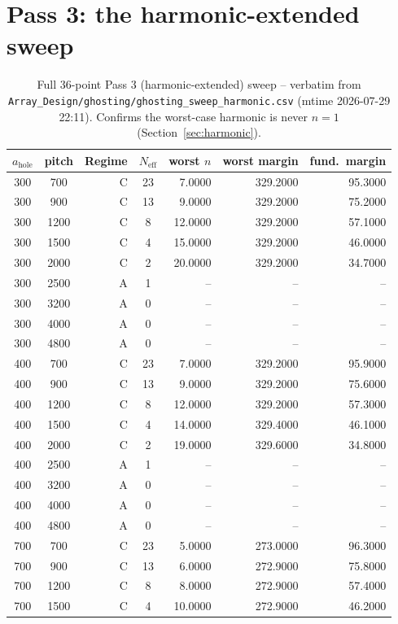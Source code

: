 \section{Pass 3: the harmonic-extended sweep}
\begin{longtable}{ccrcrrr}
\caption{Full 36-point Pass 3 (harmonic-extended) sweep -- verbatim from \texttt{Array\_Design/ghosting/ghosting\_sweep\_harmonic.csv} (mtime 2026-07-29 22:11). Confirms the worst-case harmonic is never $n=1$ (Section~\ref{sec:harmonic}).}\label{tab:full-pass3-sweep}\\
\toprule
$a_{\mathrm{hole}}$ & pitch & Regime & $N_{\mathrm{eff}}$ & worst $n$ & worst margin & fund.\ margin \\
\midrule
\endhead
300 & 700 & C & 23 & 7.0000 & 329.2000 & 95.3000 \\
300 & 900 & C & 13 & 9.0000 & 329.2000 & 75.2000 \\
300 & 1200 & C & 8 & 12.0000 & 329.2000 & 57.1000 \\
300 & 1500 & C & 4 & 15.0000 & 329.2000 & 46.0000 \\
300 & 2000 & C & 2 & 20.0000 & 329.2000 & 34.7000 \\
300 & 2500 & A & 1 & -- & -- & -- \\
300 & 3200 & A & 0 & -- & -- & -- \\
300 & 4000 & A & 0 & -- & -- & -- \\
300 & 4800 & A & 0 & -- & -- & -- \\
400 & 700 & C & 23 & 7.0000 & 329.2000 & 95.9000 \\
400 & 900 & C & 13 & 9.0000 & 329.2000 & 75.6000 \\
400 & 1200 & C & 8 & 12.0000 & 329.2000 & 57.3000 \\
400 & 1500 & C & 4 & 14.0000 & 329.4000 & 46.1000 \\
400 & 2000 & C & 2 & 19.0000 & 329.6000 & 34.8000 \\
400 & 2500 & A & 1 & -- & -- & -- \\
400 & 3200 & A & 0 & -- & -- & -- \\
400 & 4000 & A & 0 & -- & -- & -- \\
400 & 4800 & A & 0 & -- & -- & -- \\
700 & 700 & C & 23 & 5.0000 & 273.0000 & 96.3000 \\
700 & 900 & C & 13 & 6.0000 & 272.9000 & 75.8000 \\
700 & 1200 & C & 8 & 8.0000 & 272.9000 & 57.4000 \\
700 & 1500 & C & 4 & 10.0000 & 272.9000 & 46.2000 \\

\end{longtable}
